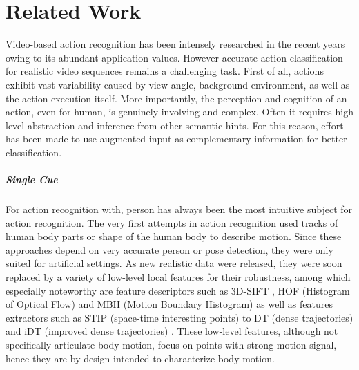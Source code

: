
\setcounter{chapter}{1}

\chapter{Related Work}\label{chap:relatedwork}
Video-based action recognition has been intensely researched in the recent years owing to its abundant application values. However accurate action classification for realistic video sequences remains a challenging task. First of all, actions exhibit vast variability caused by view angle, background environment, as well as the action execution itself. More importantly, the perception and cognition of an action, even for human, is genuinely involving and complex. Often it requires high level abstraction and inference from other semantic hints. For this reason, effort has been made to use augmented input as complementary information for better classification. 

\paragraph{Single Cue} For action recognition with, person has always been the most intuitive subject for action recognition. The very first attempts in action recognition used tracks of human body parts \cite{yacoob1998parameterized,fanti2005hybrid} or shape of the human body to describe motion. Since these approaches depend on very accurate person or pose detection, they were only suited for artificial settings. 
As new realistic data were released, they were soon replaced by a variety of low-level local features for their robustness, among which especially noteworthy are feature descriptors such as 3D-SIFT \cite{scovanner20073}, HOF (Histogram of Optical Flow) \cite{laptev2008learning} and MBH (Motion Boundary Histogram) \cite{wang2011action} as well as features extractors such as STIP (space-time interesting points) \cite{laptev2005space} to DT (dense trajectories) \cite{wang2011action} and iDT (improved dense trajectories) \cite{wang2013action}.
These low-level features, although not specifically articulate body motion, focus on points with strong motion signal, hence they are by design intended to characterize body motion.

